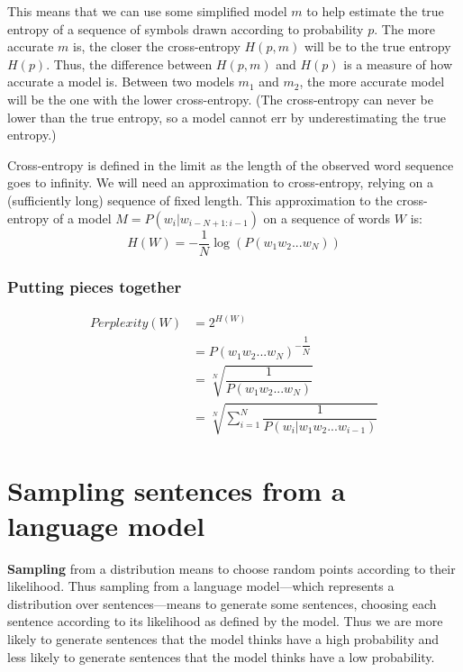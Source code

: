 This means that we can use some simplified model $m$ to help estimate the true entropy of a sequence of symbols drawn according to probability $p$. The more accurate $m$ is, the closer the cross-entropy $H(p,m)$ will be to the true entropy $H(p)$. Thus, the difference between $H(p,m)$ and $H(p)$ is a measure of how accurate a model is. Between two models $m_1$ and $m_2$, the more accurate model will be the one with the lower cross-entropy. (The cross-entropy can never be lower than the true entropy, so a model cannot err by underestimating the true entropy.)

Cross-entropy is defined in the limit as the length of the observed word sequence goes to infinity. We will need an approximation to cross-entropy, relying on a (sufficiently long) sequence of fixed length. This approximation to the cross-entropy of a model $M = P(w_i|w_{i-N+1:i-1})$ on a sequence of words $W$ is:
\[
    H(W) = -\displaystyle\dfrac{1}{N}\log(P(w_1w_2...w_N))
\]


\subsubsection{Putting pieces together}
\begin{align*}
    Perplexity(W)       
        &= 2^{H(W)}    \\ 
        &= P(w_1w_2...w_N)^{-\displaystyle\dfrac{1}{N}} \\ 
        &= \sqrt[N]{\displaystyle\dfrac{1}{P(w_1w_2...w_N)}} \\ 
        &= \sqrt[N]{\sum_{i=1}^{N} \displaystyle\dfrac{1}{P(w_i|w_1w_2...w_{i-1})}} 
\end{align*}





\section{Sampling sentences from a language model \cite{nlp-1}}

\textbf{Sampling} from a distribution means to choose random points according to their likelihood. Thus sampling from a language model—which represents a distribution over sentences—means to generate some sentences, choosing each sentence according to its likelihood as defined by the model. Thus we are more likely to generate sentences that the model thinks have a high probability and less likely to generate sentences that the model thinks have a low probability.

